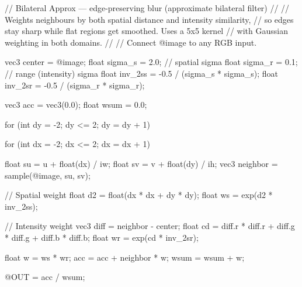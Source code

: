// Bilateral Approx — edge-preserving blur (approximate bilateral filter)
//
// Weights neighbours by both spatial distance and intensity similarity,
// so edges stay sharp while flat regions get smoothed. Uses a 5x5 kernel
// with Gaussian weighting in both domains.
//
// Connect @image to any RGB input.

vec3 center = @image;
float sigma_s = 2.0;  // spatial sigma
float sigma_r = 0.1;  // range (intensity) sigma
float inv_2ss = -0.5 / (sigma_s * sigma_s);
float inv_2sr = -0.5 / (sigma_r * sigma_r);

vec3 acc = vec3(0.0);
float wsum = 0.0;

for (int dy = -2; dy <= 2; dy = dy + 1) {
    for (int dx = -2; dx <= 2; dx = dx + 1) {
        float su = u + float(dx) / iw;
        float sv = v + float(dy) / ih;
        vec3 neighbor = sample(@image, su, sv);

        // Spatial weight
        float d2 = float(dx * dx + dy * dy);
        float ws = exp(d2 * inv_2ss);

        // Intensity weight
        vec3 diff = neighbor - center;
        float cd = diff.r * diff.r + diff.g * diff.g + diff.b * diff.b;
        float wr = exp(cd * inv_2sr);

        float w = ws * wr;
        acc = acc + neighbor * w;
        wsum = wsum + w;
    }
}

@OUT = acc / wsum;